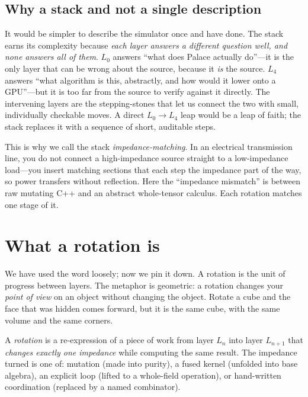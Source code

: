 \subsection{Why a stack and not a single description}

It would be simpler to describe the simulator once and have done. The stack earns
its complexity because \emph{each layer answers a different question well, and
none answers all of them}. $L_0$ answers ``what does Palace actually do''---it is
the only layer that can be wrong about the source, because it \emph{is} the
source. $L_4$ answers ``what algorithm is this, abstractly, and how would it lower
onto a GPU''---but it is too far from the source to verify against it directly.
The intervening layers are the stepping-stones that let us connect the two with
small, individually checkable moves. A direct $L_0 \to L_4$ leap would be a leap
of faith; the stack replaces it with a sequence of short, auditable steps.

This is why we call the stack \emph{impedance-matching}. In an electrical
transmission line, you do not connect a high-impedance source straight to a
low-impedance load---you insert matching sections that each step the impedance part
of the way, so power transfers without reflection. Here the ``impedance mismatch''
is between raw mutating C++ and an abstract whole-tensor calculus. Each rotation
matches one stage of it.

\section{What a rotation is}
\label{sec:whatis}

We have used the word loosely; now we pin it down. A rotation is the unit of
progress between layers. The metaphor is geometric: a rotation changes your
\emph{point of view} on an object without changing the object. Rotate a cube and
the face that was hidden comes forward, but it is the same cube, with the same
volume and the same corners.

\begin{definition}[Rotation]
\label{def:rotation}
A \emph{rotation} is a re-expression of a piece of work from layer $L_n$ into
layer $L_{n+1}$ that \emph{changes exactly one impedance} while computing the same
result. The impedance turned is one of: mutation (made into purity), a fused
kernel (unfolded into base algebra), an explicit loop (lifted to a whole-field
operation), or hand-written coordination (replaced by a named combinator).
\end{definition}

